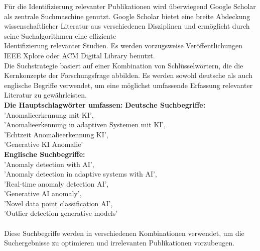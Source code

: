 \nAbsatz
Für die Identifizierung relevanter Publikationen wird überwiegend Google Scholar als zentrale Suchmaschine genutzt. Google Scholar bietet eine breite Abdeckung wissenschaftlicher Literatur aus verschiedenen Disziplinen und ermöglicht durch seine Suchalgorithmen eine effiziente \\ Identifizierung relevanter Studien. Es werden vorzugsweise Veröffentlichungen  IEEE Xplore oder ACM Digital Library benutzt.
\\
Die Suchstrategie basiert auf einer Kombination von Schlüsselwörtern, die die Kernkonzepte der Forschungsfrage abbilden. Es werden sowohl deutsche als auch englische Begriffe verwendet, um eine möglichst umfassende Erfassung relevanter Literatur zu gewährleisten. \\\textbf{ Die Hauptschlagwörter umfassen:} 
\nAbsatz
    \textbf{Deutsche Suchbegriffe: }\\
        'Anomalieerkennung mit KI', \\
        'Anomalieerkennung in adaptiven Systemen mit KI',\\
        'Echtzeit Anomalieerkennung KI',\\
        'Generative KI Anomalie'\\
\newpage
    \textbf{Englische Suchbegriffe:}\\
        'Anomaly detection with AI',\\
        'Anomaly detection in adaptive systems with AI',\\
        'Real-time anomaly detection AI',\\
        'Generative AI anomaly',\\
        'Novel data point classification AI',\\
        'Outlier detection generative models'\\
\\
Diese Suchbegriffe werden in verschiedenen Kombinationen verwendet, um die Suchergebnisse zu optimieren und irrelevanten Publikationen vorzubeugen.
